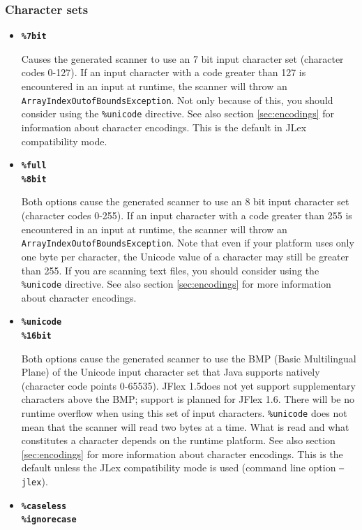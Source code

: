 \documentclass[11pt]{scrartcl}
\newcommand{\ver}{1.5}
\newcommand{\nextver}{1.6}
\begin{document}
\subsubsection{Character sets\label{CharacterSets}}
\begin{itemize}
\item
{\bf \texttt{\%7bit}}

Causes the generated scanner to use an 7 bit input character set (character
codes 0-127). If an input character with a code greater than 127 is
encountered in an input at runtime, the scanner will throw an \texttt{ArrayIndexOutofBoundsException}.
Not only because of this, you should consider using the \texttt{\%unicode} directive. 
See also section \ref{sec:encodings} for information about character encodings. This is the default in JLex compatibility mode.
 
\item
{\bf \texttt{\%full}}\\
{\bf \texttt{\%8bit}}

Both options cause the generated scanner to use an 8 bit input character
set (character codes 0-255). If an input character with a code greater
than 255 is encountered in an input at runtime, the scanner will throw
an \texttt{ArrayIndexOutofBoundsException}. Note that even if your platform
uses only one byte per character, the Unicode value of a character may
still be greater than 255. If you are scanning text files, you should
consider using the \texttt{\%unicode} directive. See also section \ref{sec:encodings}
for more information about character encodings.
 
\item
{\bf \texttt{\%unicode}}\\
{\bf \texttt{\%16bit}}

Both options cause the generated scanner to use the BMP (Basic Multilingual
Plane) of the Unicode input character set that Java supports natively
(character code points 0-65535). JFlex \ver does not yet support supplementary
characters above the BMP; support is planned for JFlex \nextver. There will be
no runtime overflow when using this set of input characters.
\texttt{\%unicode} does not mean that the scanner will read two bytes at a
time. What is read and what constitutes a character depends on the runtime
platform. See also section \ref{sec:encodings} for more information about
character encodings. This is the default unless the JLex compatibility mode
is used (command line option \texttt{--jlex}).

\label{caseless} \item {\bf \texttt{\%caseless}}\\ {\bf \texttt{\%ignorecase}}


\end{itemize}
\end{document}
